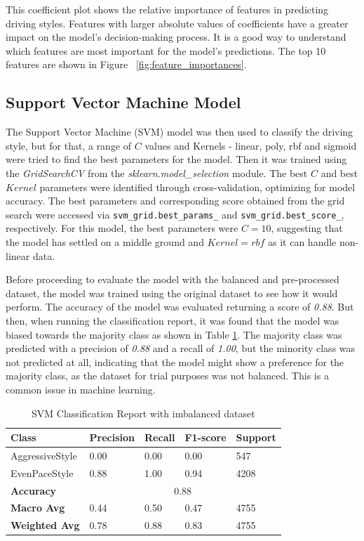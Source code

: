 \documentclass[10pt,journal,compsoc]{IEEEtran}
\begin{document}
This coefficient plot shows the relative importance of features in predicting driving styles. Features with larger absolute values of coefficients have a greater impact on the model's 
decision-making process. It is a good way to understand which features are most important for the model's predictions. The top 10 features are shown in Figure ~\ref{fig:feature_importances}.


\subsection{Support Vector Machine Model}
The Support Vector Machine (SVM) model was then used to classify the driving style, but for that, a range of $C$ values and Kernels - linear, poly, rbf and sigmoid were tried to 
find the best parameters for the model. Then it was trained using the \textit{GridSearchCV} from the \textit{sklearn.model\_selection} module. The best $C$ and best $Kernel$ parameters were identified through cross-validation, optimizing for model accuracy. 
The best parameters and corresponding score obtained from the grid search were accessed via \texttt{svm\_grid.best\_params\_} and \texttt{svm\_grid.best\_score\_}, respectively. For this model, the best parameters were $C=10$, 
suggesting that the model has settled on a middle ground and $Kernel=rbf$ as it can handle non-linear data.

Before proceeding to evaluate the model with the balanced and pre-processed dataset, the model was trained using the original dataset to see how it would perform. The accuracy of the model
was evaluated returning a score of \textit{0.88}. But then, when running the classification report, it was found that the model was biased towards the majority class as shown in 
Table \ref{table:support_classification_report}.
The majority class was predicted with a precision of \textit{0.88} and a recall of \textit{1.00}, but the minority class was not predicted at all, indicating that the model might show a preference for the majority class, 
as the dataset for trial purposes was not balanced. This is a common issue in machine learning.

\begin{table}[h]
    \centering
    \begin{tabular}{|l|l|l|l|l|}
    \hline
    \textbf{Class} & \textbf{Precision} & \textbf{Recall} & \textbf{F1-score} & \textbf{Support} \\ \hline
    AggressiveStyle & 0.00 & 0.00 & 0.00 & 547 \\ \hline
    EvenPaceStyle & 0.88 & 1.00 & 0.94 & 4208 \\ \hline
    \textbf{Accuracy} & \multicolumn{4}{c|}{0.88} \\ \hline
    \textbf{Macro Avg} & 0.44 & 0.50 & 0.47 & 4755 \\ \hline
    \textbf{Weighted Avg} & 0.78 & 0.88 & 0.83 & 4755 \\ \hline
    \end{tabular}
    \caption{SVM Classification Report with imbalanced dataset}
    \label{table:support_classification_report}
\end{table}
\end{document}
